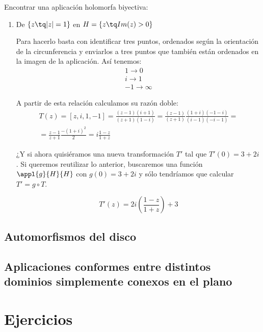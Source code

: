 \documentclass{apuntes}
\begin{document}
\begin{example}
Encontrar una aplicación holomorfa biyectiva:

\begin{enumerate}
\item De $\{z \tq |z|=1\}$ en $H=\{z \tq Im(z)>0\}$

Para hacerlo basta con identificar tres puntos, ordenados según la orientación de la circunferencia y enviarlos a tres puntos que también están ordenados en la imagen de la aplicación. Así tenemos:
\begin{align*}
1 \to 0\\ i \to 1 \\ -1 \to \infty
\end{align*}

A partir de esta relación calculamos su razón doble:
\begin{gather*}
T(z)=[z,i,1,-1]=\frac{(z-1)(i+1)}{(z+1)(1-i)}=\frac{(z-1)}{(z+1)}\frac{(1+i)(-1-i)}{(i-1)(-i-1)}=\\
=\frac{z-1}{z+1}\frac{-(1+i)^2}{2}=i\frac{1-z}{1+z}
\end{gather*}

¿Y si ahora quisiéramos una nueva transformación $T'$ tal que $T'(0)=3+2i$. Si queremos reutilizar lo anterior, buscaremos una función $\appl{g}{H}{H}$ con $g(0)=3+2i$ y sólo tendríamos que calcular $T'=g \circ T$.

\[T'(z)=2i\left( \frac{1-z}{1+z}\right)+3\]

\end{enumerate}
\end{example}

\section{Automorfismos del disco}

\section{Aplicaciones conformes entre distintos dominios simplemente conexos en el plano}





\appendix

\chapter{Ejercicios}

\printindex
\end{document}
